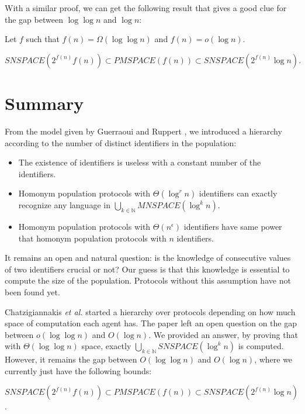 \documentclass[UKenglish]{llncs}
\begin{document}
With a similar proof, we can get the following result that gives a good clue for the gap
between $\log\log n$ and $\log n$:

\begin{corollary}
Let $f$ such that $f(n)=\Omega(\log\log n)$ and $f(n)=o(\log n)$.


$$SNSPACE(2^{f(n)}f(n))\subset PMSPACE(f(n))\subset SNSPACE(2^{f(n)}\log n).$$
\end{corollary}

\section{Summary} \label{sec:5}

From the model given  by Guerraoui and Ruppert \cite{guerraoui2009names}, we introduced a hierarchy according
to the number of distinct identifiers in the population:
\begin{itemize}
\item  The existence of identifiers is useless with a constant number of the identifiers.
\item Homonym population protocols with $\Theta(\log^r n)$ identifiers
  can exactly  recognize any language in $\bigcup_{k \in \mathbb{N}} MNSPACE\left(\log^k n\right)$.
\item Homonym population protocols with $\Theta(n^\epsilon)$ identifiers
  have same power that homonym population protocols
  with $n$ identifiers.
\end{itemize}

It remains an open and natural question: is the knowledge of consecutive values of two identifiers
 crucial or not?  Our guess is that this knowledge  is essential to compute  
the size of the population. Protocols without this assumption have not been found yet.

Chatzigiannakis \emph{et al.}  \cite{chatzigiannakis2011passively} started a hierarchy over protocols
depending on how much space of computation each agent has.
The paper left an open question on the gap between $o(\log\log n)$ and $O(\log n)$.
We provided an answer, by proving that with $\Theta(\log\log n)$ space,
exactly $\bigcup_{k \in \mathbb{N}} SNSPACE\left(\log^k n\right)$ is computed. However, it remains the gap between $O(\log\log n)$ and $O(\log n)$, where we 
currently just have the following bounds: 

$SNSPACE(2^{f(n)}f(n))\subset PMSPACE(f(n))\subset SNSPACE(2^{f(n)}\log n)$.
\end{document}
